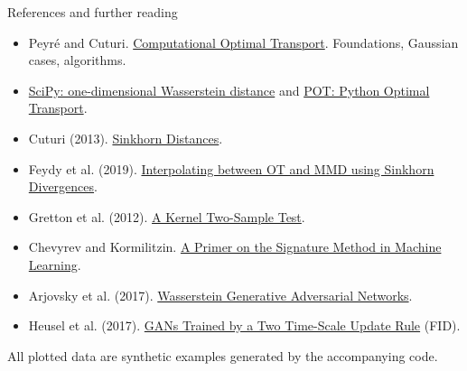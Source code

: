 \documentclass[aspectratio=169,11pt]{beamer}
\begin{document}
\begin{frame}{References and further reading}
\small
\begin{itemize}\setlength\itemsep{2mm}
\item Peyr\'e and Cuturi. \href{https://arxiv.org/abs/1803.00567}{Computational Optimal Transport}. Foundations, Gaussian cases, algorithms.
\item \href{https://docs.scipy.org/doc/scipy/reference/generated/scipy.stats.wasserstein_distance.html}{SciPy: one-dimensional Wasserstein distance} and \href{https://pythonot.github.io/all.html}{POT: Python Optimal Transport}.
\item Cuturi (2013). \href{https://arxiv.org/abs/1306.0895}{Sinkhorn Distances}.
\item Feydy et al. (2019). \href{https://proceedings.mlr.press/v89/feydy19a.html}{Interpolating between OT and MMD using Sinkhorn Divergences}.
\item Gretton et al. (2012). \href{https://jmlr.org/papers/v13/gretton12a.html}{A Kernel Two-Sample Test}.
\item Chevyrev and Kormilitzin. \href{https://arxiv.org/abs/1603.03788}{A Primer on the Signature Method in Machine Learning}.
\item Arjovsky et al. (2017). \href{https://proceedings.mlr.press/v70/arjovsky17a.html}{Wasserstein Generative Adversarial Networks}.
\item Heusel et al. (2017). \href{https://arxiv.org/abs/1706.08500}{GANs Trained by a Two Time-Scale Update Rule} (FID).
\end{itemize}
\vspace{3mm}
All plotted data are synthetic examples generated by the accompanying code.
\end{frame}
\end{document}
